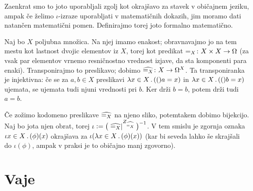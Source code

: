
Zaenkrat smo to joto uporabljali zgolj kot okrajšavo za stavek v običajnem jeziku, ampak če želimo $\iota$-izraze uporabljati v matematičnih dokazih, jim moramo dati natančen matematični pomen. Definirajmo torej joto formalno matematično.

Naj bo $X$ poljubna množica. Na njej imamo enakost; obravnavajmo jo na tem mestu kot lastnost dvojic elementov iz $X$, torej kot predikat $=_X\colon X \times X \to \Omega$ (za vsak par elementov vrnemo resničnostno vrednost izjave, da sta komponenti para enaki). Transponirajmo to preslikavo; dobimo $\widehat{=_X}\colon X \to \Omega^X$. Ta transponiranka je injektivna: če se za $a, b \in X$ preslikavi $\lam{x \in X} (a = x)$ in $\lam{x \in X} (b = x)$ ujemata, se ujemata tudi njuni vrednosti pri $b$. Ker drži $b = b$, potem drži tudi $a = b$.

Če zožimo kodomeno preslikave $\widehat{=_X}$ na njeno sliko, potemtakem dobimo bijekcijo. Naj bo jota njen obrat, torej $\iota \mathrel{\mathop:}= \big(\left.{\widehat{=_X}}\right|^{Z_{\widehat{=_X}}}\big)^{-1}$. V tem smislu je zgornja oznaka $\that{x \in X} \phi(x)$ okrajšava za $\iota (\lam{x \in X} \phi(x))$ (kar bi seveda lahko še skrajšali do $\iota(\phi)$, ampak v praksi je to običajno manj zgovorno).


\section{Vaje}


